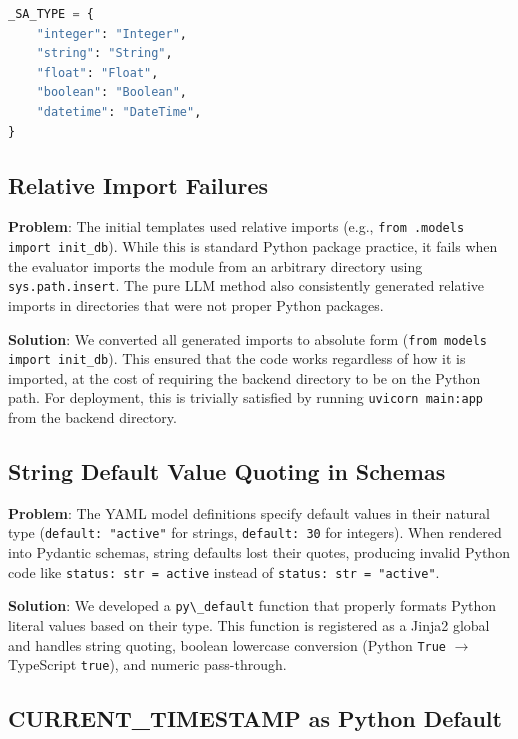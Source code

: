 \documentclass[11pt,a4paper]{article}
\begin{document}
\begin{lstlisting}[language=Python]
_SA_TYPE = {
    "integer": "Integer",
    "string": "String",
    "float": "Float",
    "boolean": "Boolean",
    "datetime": "DateTime",
}
\end{lstlisting}

\subsection{Relative Import Failures}

\textbf{Problem}: The initial templates used relative imports (e.g., \texttt{from .models import init\_db}). While this is standard Python package practice, it fails when the evaluator imports the module from an arbitrary directory using \texttt{sys.path.insert}. The pure LLM method also consistently generated relative imports in directories that were not proper Python packages.

\textbf{Solution}: We converted all generated imports to absolute form (\texttt{from models import init\_db}). This ensured that the code works regardless of how it is imported, at the cost of requiring the backend directory to be on the Python path. For deployment, this is trivially satisfied by running \texttt{uvicorn main:app} from the backend directory.

\subsection{String Default Value Quoting in Schemas}

\textbf{Problem}: The YAML model definitions specify default values in their natural type (\texttt{default: "active"} for strings, \texttt{default: 30} for integers). When rendered into Pydantic schemas, string defaults lost their quotes, producing invalid Python code like \texttt{status: str = active} instead of \texttt{status: str = "active"}.

\textbf{Solution}: We developed a {\lstinline|py\_default|} function that properly formats Python literal values based on their type. This function is registered as a Jinja2 global and handles string quoting, boolean lowercase conversion (Python \texttt{True} $\rightarrow$ TypeScript \texttt{true}), and numeric pass-through.

\subsection{CURRENT\_TIMESTAMP as Python Default}
\end{document}
